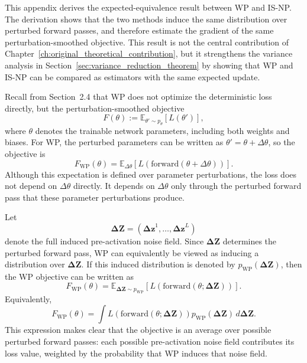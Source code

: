 This appendix derives the expected-equivalence result between WP and IS-NP. The derivation shows that the two methods induce the same distribution over perturbed forward passes, and therefore estimate the gradient of the same perturbation-smoothed objective. This result is not the central contribution of Chapter~\ref{ch:original_theoretical_contribution}, but it strengthens the variance analysis in Section~\ref{sec:variance_reduction_theorem} by showing that WP and IS-NP can be compared as estimators with the same expected update.

Recall from Section~2.4 that WP does not optimize the deterministic loss directly, but the perturbation-smoothed objective
\begin{equation}
F(\theta)
:=
\mathbb{E}_{\theta' \sim p_\theta}
\left[
L(\theta')
\right],
\end{equation}
where $\theta$ denotes the trainable network parameters, including both weights and biases. For WP, the perturbed parameters can be written as $\theta'=\theta+\Delta\theta$, so the objective is
\begin{equation}
F_{\mathrm{WP}}(\theta)
=
\mathbb{E}_{\Delta\theta}
\left[
L\!\left(\mathrm{forward}(\theta+\Delta\theta)\right)
\right].
\end{equation}
Although this expectation is defined over parameter perturbations, the loss does not depend on $\Delta\theta$ directly. It depends on $\Delta\theta$ only through the perturbed forward pass that these parameter perturbations produce.

Let
\begin{equation}
\boldsymbol{\Delta Z}
=
(\boldsymbol{\Delta z}^1,\dots,\boldsymbol{\Delta z}^L)
\end{equation}
denote the full induced pre-activation noise field. Since $\boldsymbol{\Delta Z}$ determines the perturbed forward pass, WP can equivalently be viewed as inducing a distribution over $\boldsymbol{\Delta Z}$. If this induced distribution is denoted by $p_{\mathrm{WP}}(\boldsymbol{\Delta Z})$, then the WP objective can be written as
\begin{equation}
F_{\mathrm{WP}}(\theta)
=
\mathbb{E}_{\boldsymbol{\Delta Z}\sim p_{\mathrm{WP}}}
\left[
L\!\left(\mathrm{forward}(\theta;\boldsymbol{\Delta Z})\right)
\right].
\end{equation}
Equivalently,
\begin{equation}
F_{\mathrm{WP}}(\theta)
=
\int
L\!\left(\mathrm{forward}(\theta;\boldsymbol{\Delta Z})\right)
p_{\mathrm{WP}}(\boldsymbol{\Delta Z})
\,d\boldsymbol{\Delta Z}.
\end{equation}
This expression makes clear that the objective is an average over possible perturbed forward passes: each possible pre-activation noise field contributes its loss value, weighted by the probability that WP induces that noise field.

